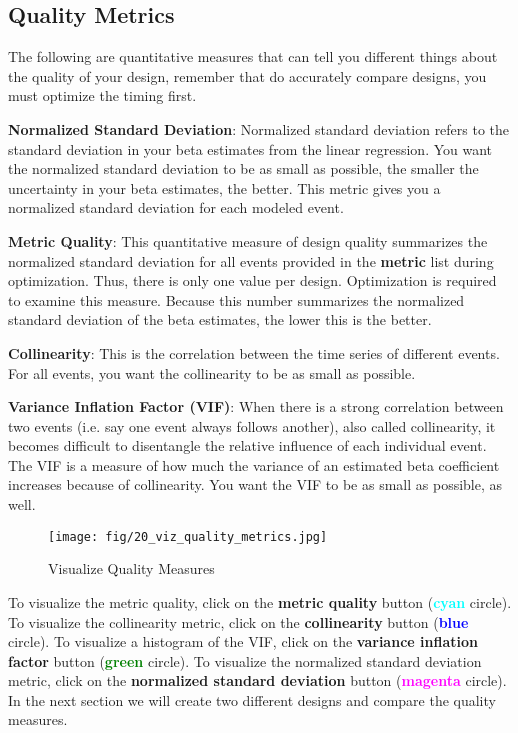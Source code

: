 \documentclass[10pt]{article}
\begin{document}
	\subsection{Quality Metrics}
	\label{subsec:u5qualmet}
		The following are quantitative measures that can tell you different things about the quality of your design, remember that do accurately compare designs, you must optimize the timing first.
		\begin{description}
			\item{\textbf{Normalized Standard Deviation}}:
				Normalized standard deviation refers to the standard deviation in your beta estimates from the linear regression. You want the normalized standard deviation to be as small as possible, the smaller the uncertainty in your beta estimates, the better.
				This metric gives you a normalized standard deviation for each modeled event.
			\item{\textbf{Metric Quality}}: This quantitative measure of design quality summarizes the normalized standard deviation for all events provided in the \textbf{metric} list during optimization.
				Thus, there is only one value per design.
				Optimization is required to examine this measure.
				Because this number summarizes the normalized standard deviation of the beta estimates, the lower this is the better.
			\item{\textbf{Collinearity}}: This is the correlation between the time series of different events.
				For all events, you want the collinearity to be as small as possible.
			\item{\textbf{Variance Inflation Factor (VIF)}}: When there is a strong correlation between two events (i.e. say one event always follows another), also called collinearity, it becomes difficult to disentangle the relative influence of each individual event. 
				The VIF is a measure of how much the variance of an estimated beta coefficient increases because of collinearity. You want the VIF to be as small as possible, as well.
		\end{description}
		\begin{figure}[ht]
			\centering
			\texttt{[image: fig/20\_viz\_quality\_metrics.jpg]}
			\caption{Visualize Quality Measures}
			\label{fig:slow_quality}
		\end{figure}
		To visualize the metric quality, click on the \textbf{metric quality} button (\textcolor{Cyan}{\textbf{cyan}} circle).
		To visualize the collinearity metric, click on the \textbf{collinearity} button (\textcolor{blue}{\textbf{blue}} circle).
		To visualize a histogram of the VIF, click on the \textbf{variance inflation factor} button (\textcolor{green}{\textbf{green}} circle).
		To visualize the normalized standard deviation metric, click on the \textbf{normalized standard deviation} button (\textcolor{Magenta}{\textbf{magenta}} circle).
		In the next section we will create two different designs and compare the quality measures.
\end{document}
